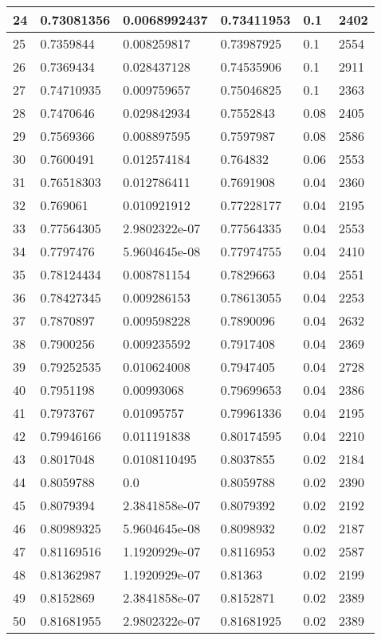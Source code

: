 \begin{longtable}{|l|l|l|l|l|l|}
24 & 0.73081356 & 0.0068992437 & 0.73411953 & 0.1 & 2402 \\ \hline 
25 & 0.7359844 & 0.008259817 & 0.73987925 & 0.1 & 2554 \\ \hline 
26 & 0.7369434 & 0.028437128 & 0.74535906 & 0.1 & 2911 \\ \hline 
27 & 0.74710935 & 0.009759657 & 0.75046825 & 0.1 & 2363 \\ \hline 
28 & 0.7470646 & 0.029842934 & 0.7552843 & 0.08 & 2405 \\ \hline 
29 & 0.7569366 & 0.008897595 & 0.7597987 & 0.08 & 2586 \\ \hline 
30 & 0.7600491 & 0.012574184 & 0.764832 & 0.06 & 2553 \\ \hline 
31 & 0.76518303 & 0.012786411 & 0.7691908 & 0.04 & 2360 \\ \hline 
32 & 0.769061 & 0.010921912 & 0.77228177 & 0.04 & 2195 \\ \hline 
33 & 0.77564305 & 2.9802322e-07 & 0.77564335 & 0.04 & 2553 \\ \hline 
34 & 0.7797476 & 5.9604645e-08 & 0.77974755 & 0.04 & 2410 \\ \hline 
35 & 0.78124434 & 0.008781154 & 0.7829663 & 0.04 & 2551 \\ \hline 
36 & 0.78427345 & 0.009286153 & 0.78613055 & 0.04 & 2253 \\ \hline 
37 & 0.7870897 & 0.009598228 & 0.7890096 & 0.04 & 2632 \\ \hline 
38 & 0.7900256 & 0.009235592 & 0.7917408 & 0.04 & 2369 \\ \hline 
39 & 0.79252535 & 0.010624008 & 0.7947405 & 0.04 & 2728 \\ \hline 
40 & 0.7951198 & 0.00993068 & 0.79699653 & 0.04 & 2386 \\ \hline 
41 & 0.7973767 & 0.01095757 & 0.79961336 & 0.04 & 2195 \\ \hline 
42 & 0.79946166 & 0.011191838 & 0.80174595 & 0.04 & 2210 \\ \hline 
43 & 0.8017048 & 0.0108110495 & 0.8037855 & 0.02 & 2184 \\ \hline 
44 & 0.8059788 & 0.0 & 0.8059788 & 0.02 & 2390 \\ \hline 
45 & 0.8079394 & 2.3841858e-07 & 0.8079392 & 0.02 & 2192 \\ \hline 
46 & 0.80989325 & 5.9604645e-08 & 0.8098932 & 0.02 & 2187 \\ \hline 
47 & 0.81169516 & 1.1920929e-07 & 0.8116953 & 0.02 & 2587 \\ \hline 
48 & 0.81362987 & 1.1920929e-07 & 0.81363 & 0.02 & 2199 \\ \hline 
49 & 0.8152869 & 2.3841858e-07 & 0.8152871 & 0.02 & 2389 \\ \hline 
50 & 0.81681955 & 2.9802322e-07 & 0.81681925 & 0.02 & 2389 \\ \hline 
\end{longtable}